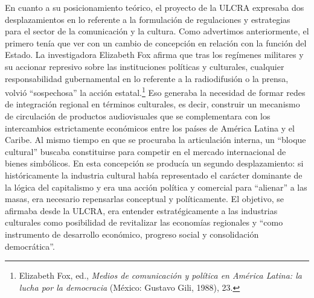 \documentclass{tufte-handout}
\begin{document}
En cuanto a su posicionamiento teórico, el proyecto de la ULCRA
expresaba dos desplazamientos en lo referente a la formulación de
regulaciones y estrategias para el sector de la comunicación y la
cultura. Como advertimos anteriormente, el primero tenía que ver con un
cambio de concepción en relación con la función del Estado. La
investigadora Elizabeth Fox afirma que tras los regímenes militares y su
accionar represivo sobre las instituciones políticas y culturales,
cualquier responsabilidad gubernamental en lo referente a la
radiodifusión o la prensa, volvió ``sospechosa'' la acción
estatal.\footnote{Elizabeth Fox, ed., \emph{Medios de comunicación y
  política en América Latina: la lucha por la democracia} (México:
  Gustavo Gili, 1988), 23.} Eso generaba la necesidad de formar redes de
integración regional en términos culturales, es decir, construir un
mecanismo de circulación de productos audiovisuales que se complementara
con los intercambios estrictamente económicos entre los países de
América Latina y el Caribe. Al mismo tiempo en que se procuraba la
articulación interna, un ``bloque cultural'' buscaba constituirse para
competir en el mercado internacional de bienes simbólicos. En esta
concepción se producía un segundo desplazamiento: si históricamente la
industria cultural había representado el carácter dominante de la lógica
del capitalismo y era una acción política y comercial para ``alienar'' a
las masas, era necesario repensarlas conceptual y políticamente. El
objetivo, se afirmaba desde la ULCRA, era entender estratégicamente a
las industrias culturales como posibilidad de revitalizar las economías
regionales y ``como instrumento de desarrollo económico, progreso social
y consolidación democrática''.
\end{document}
